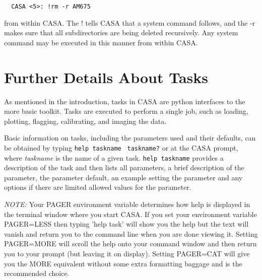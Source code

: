\small
\begin{verbatim}
  CASA <5>: !rm -r AM675
\end{verbatim}
\normalsize

from within CASA.  The ! tells CASA that a system command follows,
and the -r makes sure that all subdirectories are being deleted
recursively.  Any system command may be executed in this manner from
within CASA.


\section{Further Details About Tasks}
\label{section:more.tasks}

As mentioned in the introduction, tasks in CASA are python interfaces
to the more basic toolkit.  Tasks are executed to perform a single
job, such as loading, plotting, flagging, calibrating, and imaging the
data.

Basic information on tasks, including the parameters used and their
defaults, can be obtained by typing {\tt help taskname} {\tt
taskname?} or at the CASA prompt, where {\it taskname} is the name of
a given task.  {\tt help taskname} provides a description of the task
and then lists all parameters, a brief description of the parameter,
the parameter default, an example setting the parameter and any
options if there are limited allowed values for the parameter.

{\it NOTE:} Your PAGER environment variable determines how help is
displayed in the terminal window where you start CASA. If you set
your environment variable PAGER=LESS then typing 'help task' will show
you the help but the text will vanish and return you to the command
line when you are done viewing it. Setting PAGER=MORE will scroll the
help onto your command window and then return you to your prompt (but
leaving it on display). Setting PAGER=CAT will give you the MORE
equivalent without some extra formatting baggage and is the
recommended choice.

